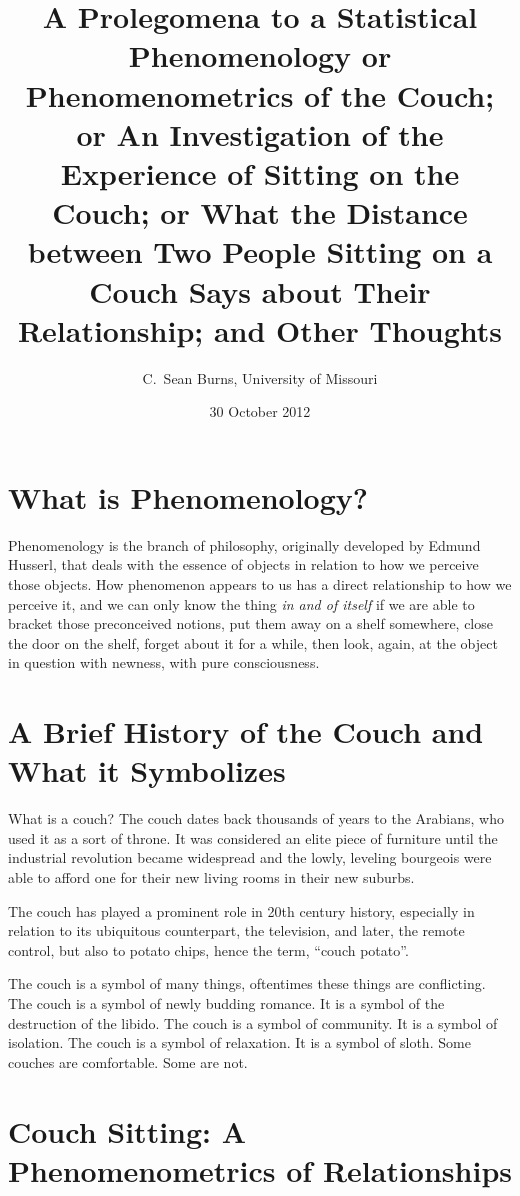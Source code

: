 \documentclass[12pt]{article}
\author{C.\ Sean Burns, University of Missouri}
\title{A Prolegomena to a Statistical Phenomenology or
    Phenomenometrics of the Couch; or An Investigation of the
    Experience of Sitting on the Couch; or What the Distance
    between Two People Sitting on a Couch Says about Their
    Relationship; and Other Thoughts}
\date{30 October 2012}
\begin{document}
\maketitle


\section{What is Phenomenology?}


Phenomenology is the branch of philosophy, originally developed by
Edmund Husserl, that deals with the essence of objects in relation
to how we perceive those objects. How phenomenon appears to us has
a direct relationship to how we perceive it, and we can only know
the thing \textit{in and of itself} if we are able to bracket
those preconceived notions, put them away on a shelf somewhere,
close the door on the shelf, forget about it for a while, then
look, again, at the object in question with newness, with pure
consciousness.


\section{A Brief History of the Couch and What it Symbolizes}


What is a couch? The couch dates back thousands of years to the
Arabians, who used it as a sort of throne. It was considered an
elite piece of furniture until the industrial revolution became
widespread and the lowly, leveling bourgeois were able to afford
one for their new living rooms in their new suburbs.

The couch has played a prominent role in 20th century history,
especially in relation to its ubiquitous counterpart, the
television, and later, the remote control, but also to potato
chips, hence the term, ``couch potato''.

The couch is a symbol of many things, oftentimes these things are
conflicting. The couch is a symbol of newly budding romance. It is
a symbol of the destruction of the libido. The couch is a symbol
of community. It is a symbol of isolation. The couch is a symbol
of relaxation. It is a symbol of sloth. Some couches are
comfortable. Some are not.

\section{Couch Sitting: A Phenomenometrics of Relationships}
\end{document}
